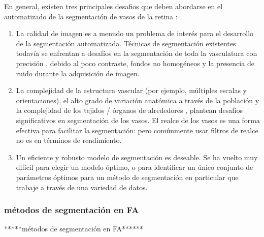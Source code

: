 En general, existen tres principales desafios que deben abordarse en el automatizado de la segmentación de vasos de la retina :
\begin{enumerate}
\item La calidad de imagen es a menudo un problema de interés para el desarrollo de la segmentación automatizada. Técnicas de segmentación existentes todavía se enfrentan a desafíos en la segmentación de toda la vasculatura con precisión , debido al poco contraste, fondos no homogéneos y la presencia de ruido durante la adquisición de imagen.
\item La complejidad de la estructura vascular (por ejemplo, múltiples escalas y orientaciones), el alto grado de variación anatómica a través de la población y la complejidad de los tejidos / órganos de alrededores
, plantean desafíos significativos en segmentación de los vasos. El realce de los vasos es
una forma efectiva para facilitar la segmentación:  pero comúnmente usar filtros de realce no es en términos de rendimiento.
\item Un eficiente y robusto modelo de segmentación  es deseable. Se ha vuelto muy difícil
para elegir un modelo óptimo, o para identificar un único conjunto de parámetros óptimos para un método de segmentación en particular que trabaje a través de una variedad de datos.\cite{zhao2015retinal}
\end{enumerate}



\subsubsection{métodos de segmentación en FA}
*****métodos de segmentación en FA******
